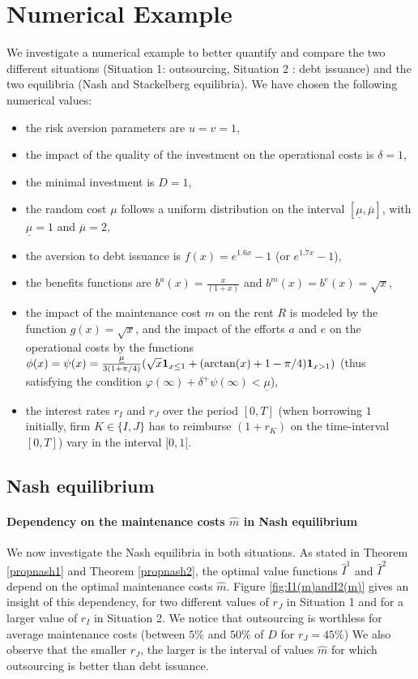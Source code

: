 \documentclass{svjour3}
\begin{document}
\section{Numerical Example}
\label{sec:example}
We investigate a numerical example to better quantify and compare the two different situations (Situation 1: outsourcing, Situation 2 : debt issuance) and the
 two equilibria (Nash and Stackelberg equilibria). We have chosen the following numerical values: 
\begin{itemize}
\item the risk aversion parameters are $u = v = 1$, 
\item  the impact of the quality of the investment on the operational costs is $\delta = 1$,
\item the minimal investment is $D = 1$,
\item the random cost $\mu$  follows  a uniform distribution on the interval $[\underline{\mu} ,\overline{\mu}] $, with $\underline{\mu} = 1$ and $\overline{\mu} = 2$,
\item the aversion to debt issuance  is $f(x) = e^{1.6 x} - 1$  (or $e^{1.7 x} - 1$),
\item the benefits functions are $b^a(x) = \frac{x}{(1+x)}$ and $b^m(x) = b^e(x) = \sqrt{x}$,
\item the impact of the maintenance cost $m$ on the rent $R$  is modeled by the function $g(x) = \sqrt{x}$, and the 
 impact of the efforts $a$ and $e$ on the operational costs   by the functions 
$\phi(x) = \psi(x) = \frac{\underline{\mu}}{3(1+\pi/4)} (  \sqrt{x} {\bf 1}_{x \leq 1} + (\arctan(x) + 1 - \pi/4) {\bf 1}_{x > 1}      )$ 
(thus satisfying the condition $\varphi(\infty)+\delta^+\psi(\infty)< \underline{\mu}$),
\item the interest rates $r_I$ and  $r_J$ over the period $[0,T]$ (when borrowing $1$ initially, firm $K\in\{I,J\}$ has to reimburse $(1+r_K)$ on the time-interval $[0,T]$) vary in the interval  $[0,1[$.
\end{itemize}

\subsection{Nash equilibrium}
\label{fig:Nash}
\paragraph{Dependency on the  maintenance costs $\hat{m}$ in Nash equilibrium}
We now investigate the Nash equilibria in both situations. As stated in Theorem \ref{propnash1} and Theorem \ref{propnash2}, the optimal value functions $\hat{I}^1$ and $\hat{I}^2$ depend on the optimal maintenance costs $\hat{m}$. 
 Figure \ref{fig:I1(m)andI2(m)} gives an insight of this dependency, for two different values of $r_J$ in Situation 1 and for a larger value of $r_I$ in Situation 2.
We notice that outsourcing is worthless for average maintenance costs (between $5 \% $ and $50 \% $ of $D$ for $r_J=45\%$) 
We also observe that the smaller $r_J$, the larger is the interval of values $\hat{m}$ for which outsourcing is better than debt issuance.
\end{document}
